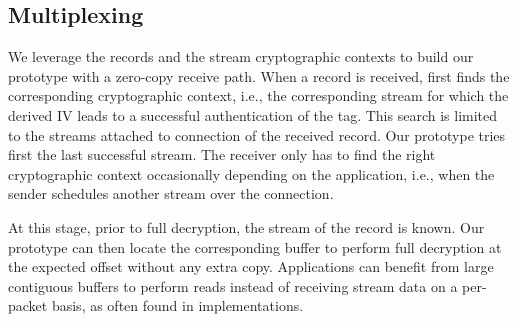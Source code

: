 \subsection{Multiplexing}
\label{sec:prot-multiplexing}

We leverage the \tcpls records and the \tcpls stream cryptographic contexts to
build our prototype with a zero-copy receive path. When a record is received,
\tcpls first finds the corresponding cryptographic context, i.e., the corresponding \tcpls stream for which the derived IV leads to a successful
authentication of the tag. This search is limited to the streams attached to
\tcp connection of the received record. Our prototype tries first the last
successful \tcpls stream. The receiver only has to find the right cryptographic
context occasionally depending on the application, i.e., when the sender
schedules another stream over the \tcp connection.

At this stage, prior to full decryption, the \tcpls stream of the record is known. Our prototype can then locate the corresponding buffer to perform full decryption at the expected offset without any extra copy. Applications can benefit from large contiguous buffers to perform reads instead of receiving stream data on a per-packet basis, as often found in \quic implementations.



